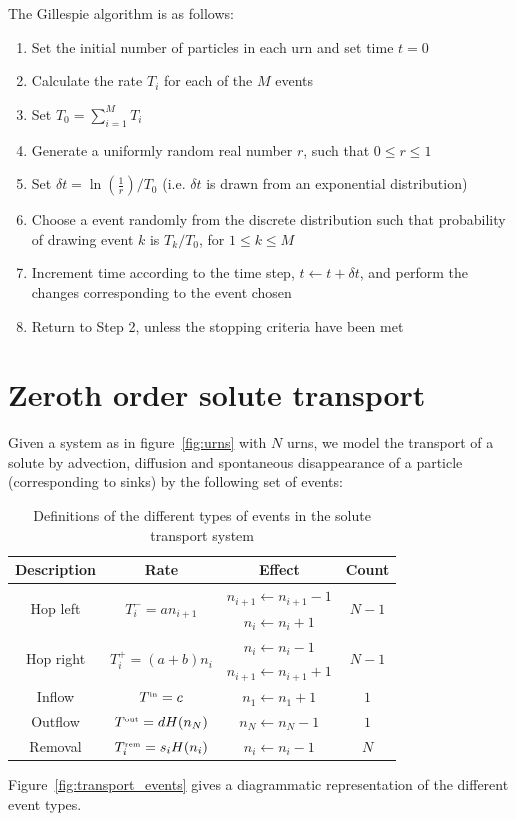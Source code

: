 \documentclass[a4paper,11pt]{article}
\numberwithin{equation}{section}
\newcommand{\Sst}[1]{^\text{\tiny #1}}
\begin{document}
The Gillespie algorithm is as follows:
\begin{enumerate}
    \item Set the initial number of particles in each urn and set time \(t=0\)
    \item Calculate the rate \(T_i\) for each of the \(M\) events
    \item Set \(T_0 = \sum_{i=1}^M T_i\)
    \item Generate a uniformly random real number \(r\), such that \(0 \le r \le 1\)
    \item Set \(\delta t = \ln\left(\frac{1}{r}\right)/T_0\) (i.e. \(\delta t\)
        is drawn from an exponential distribution)
    \item Choose a event randomly from the discrete distribution such that
        probability of drawing event \(k\) is \(T_k/T_0\), for \(1 \le k \le
        M\)
    \item Increment time according to the time step, \(t \leftarrow t + \delta
        t\), and perform the changes corresponding to the event chosen
    \item Return to Step 2, unless the stopping criteria have been met
\end{enumerate}

\section{Zeroth order solute transport}
Given a system as in figure~\ref{fig:urns} with \(N\) urns, we model the
transport of a solute by advection, diffusion and spontaneous disappearance of a
particle (corresponding to sinks) by the following set of events:

\begin{table}[ht!]
    \centering
    \begin{tabular}{ c | c | c | c }
        Description & Rate & Effect & Count \\ \hline\hline
        \multirow{2}{*}{Hop left} & \multirow{2}{*}{\(T^-_i = a n_{i+1}\)} &
        \(n_{i+1} \leftarrow n_{i+1} - 1\) & \multirow{2}{*}{\(N-1\)} \\
        & & \(n_i \leftarrow n_i + 1\) \\ \hline
        \multirow{2}{*}{Hop right} & \multirow{2}{*}{\(T^+_i = (a+b) n_i\)} &
        \(n_i \leftarrow n_i - 1\) & \multirow{2}{*}{\(N-1\)} \\
        & & \(n_{i+1} \leftarrow n_{i+1} + 1\) \\ \hline
        Inflow & \(T\Sst{in} = c\) & \(n_1 \leftarrow n_1 + 1\) & \(1\) \\ \hline
        Outflow & \(T\Sst{out} = d H(n_N)\) & \(n_N \leftarrow n_N - 1\) & \(1\) \\ \hline
        Removal & \(T\Sst{rem}_i = s_i H(n_i)\) & \(n_i \leftarrow n_i - 1\) & \(N\) \\
    \end{tabular}
    \caption{\label{tab:transport_events}Definitions of the different types of
events in the solute transport system}
\end{table}
Figure~\ref{fig:transport_events} gives a diagrammatic representation of the
different event types.
\end{document}
